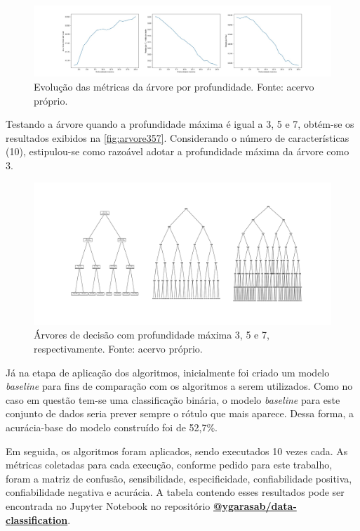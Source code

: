\documentclass[12pt]{article}
\begin{document}
\begin{figure}[t!]
    \includegraphics[width=\linewidth]{figures/acuracia_por_profundidade}
    \caption{Evolução das métricas da árvore por profundidade. Fonte: acervo próprio.}
    \label{fig:acuracia_profundidade}
\end{figure}

Testando a árvore quando a profundidade máxima é igual a 3, 5 e 7, obtém-se os resultados exibidos na \autoref{fig:arvore357}. Considerando o número de características (10), estipulou-se como razoável adotar a profundidade máxima da árvore como 3.

\begin{figure}[t!]
    \includegraphics[width=\linewidth]{figures/arvore_357}
    \caption{Árvores de decisão com profundidade máxima 3, 5 e 7, respectivamente. Fonte: acervo próprio.}
    \label{fig:arvore357}
\end{figure}

Já na etapa de aplicação dos algoritmos, inicialmente foi criado um modelo \textit{baseline} para fins de comparação com os algoritmos a serem utilizados. Como no caso em questão tem-se uma classificação binária, o modelo \textit{baseline} para este conjunto de dados seria prever sempre o rótulo que mais aparece. Dessa forma, a acurácia-base do modelo construído foi de 52,7\%.

Em seguida, os algoritmos foram aplicados, sendo executados 10 vezes cada. As métricas coletadas para cada execução, conforme pedido para este trabalho, foram a matriz de confusão, sensibilidade, especificidade, confiabilidade positiva, confiabilidade negativa e acurácia. A tabela contendo esses resultados pode ser encontrada no Jupyter Notebook no repositório \textbf{\href{https://github.com/ygarasab/data-classification}{@ygarasab/data-classification}}.
\end{document}
